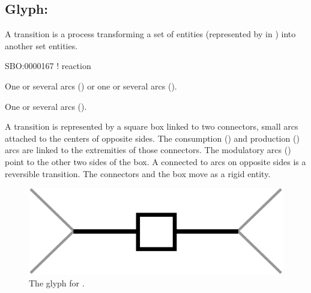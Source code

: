 

\subsection{Glyph: }
\label{sec:transition}

A transition is a process transforming a set of entities (represented by  in \SBGNPDLone) into another set entities.

\begin{glyphDescription}

\glyphSboTerm SBO:0000167 ! reaction

\glyphOrigin One or several  arcs () or one or several  arcs ().

\glyphTarget One or several  arcs ().

\glyphNode A transition is represented by a square box linked to two connectors, small arcs attached to the centers of opposite sides. The consumption () and production () arcs are linked to the extremities of those connectors. The modulatory arcs () point to the other two sides of the box. A  connected to  arcs on opposite sides is a reversible transition. The connectors and the box move as a rigid entity.

\end{glyphDescription}

\begin{figure}[H]
  \centering
  \includegraphics[scale = 0.4]{images/transition}
  \caption{The \PD glyph for .}
  \label{fig:transition}
\end{figure}

